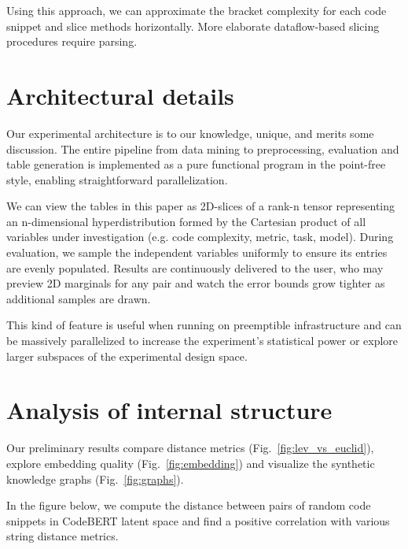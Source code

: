 \documentclass[sigconf,review,anonymous]{acmart}
\begin{document}
  Using this approach, we can approximate the bracket complexity for each code snippet and slice methods horizontally. More elaborate dataflow-based slicing procedures require parsing.

  \section{Architectural details}\label{sec:architecture}

  Our experimental architecture is to our knowledge, unique, and merits some discussion. The entire pipeline from data mining to preprocessing, evaluation and table generation is implemented as a pure functional program in the point-free style, enabling straightforward parallelization.

  We can view the tables in this paper as 2D-slices of a rank-n tensor representing an n-dimensional hyperdistribution formed by the Cartesian product of all variables under investigation (e.g. code complexity, metric, task, model). During evaluation, we sample the independent variables uniformly to ensure its entries are evenly populated. Results are continuously delivered to the user, who may preview 2D marginals for any pair and watch the error bounds grow tighter as additional samples are drawn.

  This kind of feature is useful when running on preemptible infrastructure and can be massively parallelized to increase the experiment's statistical power or explore larger subspaces of the experimental design space.

  \section{Analysis of internal structure}\label{sec:probe_internals}

  Our preliminary results compare distance metrics (Fig.~\ref{fig:lev_vs_euclid}), explore embedding quality (Fig.~\ref{fig:embedding}) and visualize the synthetic knowledge graphs (Fig.~\ref{fig:graphs}).

  In the figure below, we compute the distance between pairs of random code snippets in CodeBERT latent space and find a positive correlation with various string distance metrics.
\end{document}
